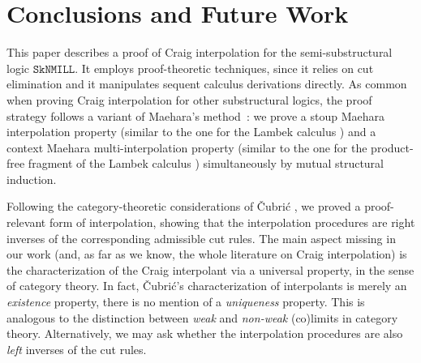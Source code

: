 \documentclass[sn-mathphys-num]{sn-jnl}%
\newcommand{\ot}{\otimes}
\newcommand{\unit}{\mathsf{I}}
\newcommand{\sls}{\slash}
\newcommand{\SkNMILL}{$\mathtt{SkNMILL}$}
\theoremstyle{thmstyleone}%
\theoremstyle{thmstyletwo}%
\theoremstyle{thmstylethree}%
\begin{document}
\section{Conclusions and Future Work}

This paper describes a proof of Craig interpolation for the semi-substructural logic \SkNMILL.
It employs proof-theoretic techniques, since it relies on cut elimination and it manipulates sequent calculus derivations directly.
As common when proving Craig interpolation for other substructural logics, the proof strategy follows a variant of Maehara's method~\cite{maehara1961}:
we prove a stoup Maehara interpolation property (similar to the one for the Lambek calculus \cite{ono:proof:nonclassical:1998}) and a context Maehara multi-interpolation property (similar to the one for the product-free fragment of the Lambek calculus \cite{Pentus1997}) simultaneously by mutual structural induction.

Following the category-theoretic considerations of {\v{C}}ubri{\'c} \cite{Cubric1994}, we proved a proof-relevant form of interpolation, showing that the interpolation procedures are right inverses of the corresponding admissible cut rules.
The main aspect missing in our work (and, as far as we know, the whole literature on Craig interpolation) is the characterization of the Craig interpolant via a universal property, in the sense of category theory.
In fact, {\v{C}}ubri{\'c}'s characterization of interpolants is merely an \emph{existence} property, there is no mention of a \emph{uniqueness} property.
This is analogous to the distinction between \emph{weak} and \emph{non-weak} (co)limits in category theory.
Alternatively, we may ask whether the interpolation procedures are also \emph{left} inverses of the cut rules.
\end{document}
